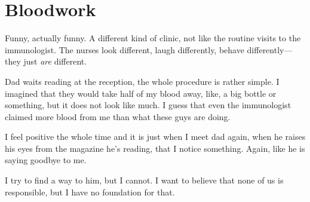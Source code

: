 \chapter*{Bloodwork}\label{bloodwork}

Funny, actually funny. A different kind of clinic, not like the routine visits to the immunologist. The nurses look different, laugh differently, behave differently--- they just \emph{are} different.

Dad waits reading at the reception, the whole procedure is rather simple. I imagined that they would take half of my blood away, like, a big bottle or something, but it does not look like much. I guess that even the immunologist claimed more blood from me than what these guys are doing.

I feel positive the whole time and it is just when I meet dad again, when he raises his eyes from the magazine he's reading, that I notice something. Again, like he is saying goodbye to me. 

I try to find a way to him, but I cannot. I want to believe that none of us is responsible, but I have no foundation for that.